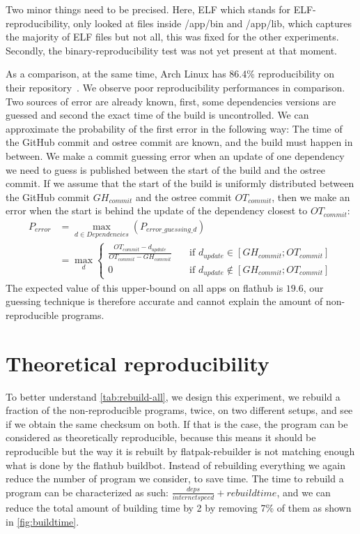 \documentclass[a4paper,11pt,oneside]{report}
\theoremstyle{definition}
\newcommand{\sysname}{flatpak-rebuilder\xspace}
\newcommand{\fh}{flathub\xspace}
\newcommand{\fhbb}{flathub buildbot\xspace}
\begin{document}
Two minor things need to be precised. Here, ELF which stands for
ELF-reproducibility, only looked at files inside /app/bin and /app/lib, which
captures the majority of ELF files but not all, this was fixed for the other
experiments. Secondly, the binary-reproducibility test was not yet present at
that moment.

As a comparison, at the same time, Arch Linux has 86.4\% reproducibility on
their repository~\cite{arch-rebuilderd}. We observe poor reproducibility
performances in comparison. Two sources of error are already known, first, some
dependencies versions are guessed and second the exact time of the build is
uncontrolled. We can approximate the probability of the first error in the
following way: The time of the GitHub commit and ostree commit are known, and
the build must happen in between. We make a commit guessing error when an
update of one dependency we need to guess is published between the start of the
build and the ostree commit. If we assume that the start of the build is
uniformly distributed between the GitHub commit $GH_{commit}$ and the ostree
commit $OT_{commit}$, then we make an error when the start is behind the update
of the dependency closest to $OT_{commit}$:
\begin{align}
    P_{error} &= \max_{d \in Dependencies}(P_{error\_guessing\_d}) \\
              &= \max_{d}
              \begin{cases}
                \frac{OT_{commit} - d_{update}}{OT_{commit} -
                    GH_{commit}}  & \quad \text{if } d_{update}
                    \in [GH_{commit}; OT_{commit}] \\
                0  & \quad \text{if } d_{update}
                  \notin [GH_{commit}; OT_{commit}]
              \end{cases}
\end{align}
The expected value of this upper-bound on all apps on \fh is $19.6$, our
guessing technique is therefore accurate and cannot explain the amount of
non-reproducible programs.


\section{Theoretical reproducibility}
\label{sec:theo-repro}
To better understand \autoref{tab:rebuild-all}, we design this experiment, we
rebuild a fraction of the non-reproducible programs, twice, on two different
setups, and see if we obtain the same checksum on both. If that is the case,
the program can be considered as theoretically reproducible, because this means
it should be reproducible but the way it is rebuilt by \sysname is not matching
enough what is done by the \fhbb. Instead of rebuilding everything we again
reduce the number of program we consider, to save time. The time to rebuild a
program can be characterized as such: $\frac{deps}{internet speed} + rebuild
time$, and we can reduce the total amount of building time by 2 by removing 7\%
of them as shown in \autoref{fig:buildtime}.
\end{document}
